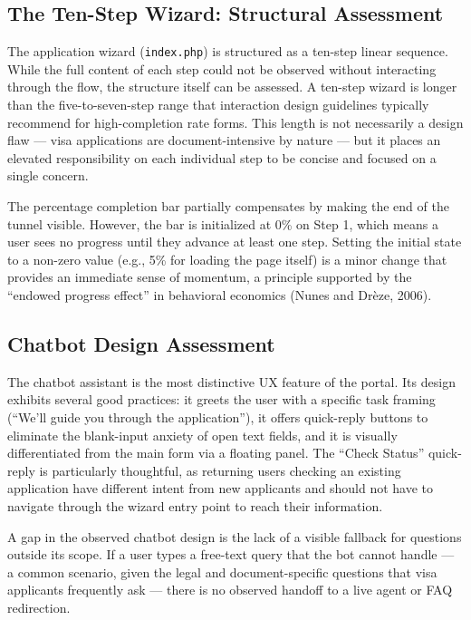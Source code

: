 \documentclass[journal, 10pt, twoside]{IEEEtran}
\begin{document}
\subsection{The Ten-Step Wizard: Structural Assessment}
\label{subsec:wizard}
The application wizard (\texttt{index.php}) is structured as a ten-step
linear sequence. While the full content of each step could not be observed
without interacting through the flow, the structure itself can be assessed.
A ten-step wizard is longer than the five-to-seven-step range that
interaction design guidelines typically recommend for high-completion
rate forms. This length is not necessarily a design flaw --- visa
applications are document-intensive by nature --- but it places an
elevated responsibility on each individual step to be concise and
focused on a single concern.

The percentage completion bar partially compensates by making the end
of the tunnel visible. However, the bar is initialized at 0\% on Step 1,
which means a user sees no progress until they advance at least one step.
Setting the initial state to a non-zero value (e.g., 5\% for loading the
page itself) is a minor change that provides an immediate sense of momentum,
a principle supported by the ``endowed progress effect'' in behavioral
economics (Nunes and Drèze, 2006).

\subsection{Chatbot Design Assessment}
\label{subsec:chatbot}
The chatbot assistant is the most distinctive UX feature of the portal.
Its design exhibits several good practices: it greets the user with a
specific task framing (``We'll guide you through the application''), it
offers quick-reply buttons to eliminate the blank-input anxiety of open
text fields, and it is visually differentiated from the main form via
a floating panel. The ``Check Status'' quick-reply is particularly
thoughtful, as returning users checking an existing application have
different intent from new applicants and should not have to navigate
through the wizard entry point to reach their information.

A gap in the observed chatbot design is the lack of a visible fallback
for questions outside its scope. If a user types a free-text query that
the bot cannot handle --- a common scenario, given the legal and
document-specific questions that visa applicants frequently ask ---
there is no observed handoff to a live agent or FAQ redirection.
\end{document}
